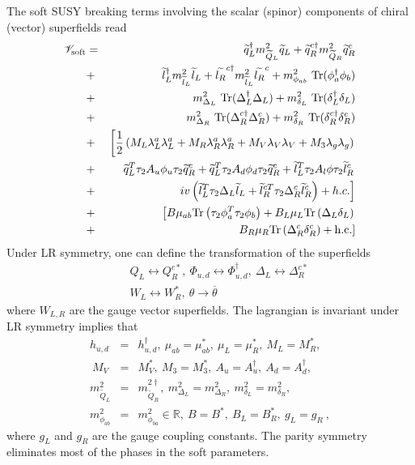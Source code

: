 \documentclass[prd,aps,preprint,tightenlines,superscriptaddress]{revtex4}
\begin{document}
The soft SUSY breaking terms involving the scalar (spinor) components of chiral
(vector) superfields read
\begin{eqnarray}
\mathscr{V}_{\rm soft} &=& \widetilde q_L^\dag m_{\widetilde Q_L}^2 \widetilde q_L +
\widetilde q_R^{c\dag} m_{\widetilde Q_R}^2
\widetilde q_R^c \nonumber \\
& + & \widetilde l_L^\dag m_{\widetilde l_L}^2 \widetilde
l_L + \widetilde{l_R}^{c \dag} m_{\widetilde l_L}^2 \widetilde{l_R}^c + m^2_{\phi_{ab}}{~\rm Tr}(\phi_a^\dag \phi_b) \nonumber \\
& + & m_{\Delta_L}^2 {~\rm Tr}(\Delta_L^\dag \Delta_L) +
m_{\delta_L}^2{~\rm Tr}(\delta_L^\dag \delta_L) \nonumber \\
& + & m_{\Delta_R}^2{~\rm Tr}(\Delta_R^{c\dag} \Delta_R^c) +
m_{\delta_R}^2{~\rm Tr}(\delta_R^{c\dag} \delta_R^c) \nonumber \\
& + & \left[ \frac{1}{2} \left(  M_L \lambda_L^a \lambda^a_L + M_R
\lambda_R^a \lambda^a_R + M_V \lambda_V \lambda_V + M_3 \lambda_g
\lambda_g \right) \right.  \nonumber\\
& + & \left. \widetilde q_L^T \tau_2 A_u \phi_u \tau_2 \widetilde
q_R^c + \widetilde q_L^T \tau_2 A_d \phi_d \tau_2 \widetilde q_R^c +
\widetilde l_L^T \tau_2 A_l \phi \tau_2 \widetilde l_R^c \right. \nonumber \\
& + & \left. i v \left( \widetilde l_L^T \tau_2 \Delta_L \widetilde l_L + \widetilde
l_R^{cT} \tau_2 \Delta_R^c \widetilde l_R^c \right) + h.c. \right] \nonumber \\
& + & \left[  B \mu_{ab} {\rm Tr}\left( \tau_2 \phi_a^T \tau_2 \phi_b
\right) + B_L \mu_L {\rm Tr}\left( \Delta_L \delta_L \right) \right. \nonumber \\
& + & \left.  B_R \mu_R {\rm Tr}\left( \Delta_R^c \delta_R^c \right)  + {\rm h.c.}
\right]
\end{eqnarray}
Under LR symmetry, one can define the transformation of the superfields \cite{susylr}
\begin{eqnarray}
&&Q_L \leftrightarrow Q_R^{c*}, \ \Phi_{u,d} \leftrightarrow
\Phi_{u,d}^{\dag},\ \Delta_L \leftrightarrow \Delta_R^{c*} \nonumber \\
&& W_L \leftrightarrow W_R^{*}, \ \theta \rightarrow \overline
\theta
\end{eqnarray}
where $W_{L, R}$ are the gauge vector superfields.  The lagrangian is invariant under
LR symmetry implies that
\begin{eqnarray}\label{hermitian}
h_{u, d} &=& h_{u, d}^{\dag}, \ \mu_{ab} = \mu_{ab}^*, \ \mu_L =
\mu_R^*, \ M_L = M_R^*, \nonumber \\
\ M_V &=& M_V^*, \ M_3 = M_3^*, \ A_u = A_u^{\dag}, \ A_d =
A_d^{\dag}, \nonumber \\
m_{\widetilde Q_L}^2 &=& m_{\widetilde Q_R}^{2\dag}, \
m_{\Delta_L}^2 = m_{\Delta_R}^2, \ m_{\delta_L}^2 = m_{\delta_R}^2, \nonumber \\
m_{\phi_{ab}}^2 &=& m_{\phi_{ba}}^2 \in \mathbb{R}, \ B = B^*, \ B_{L} = B_R^*, \ g_L=
g_R \ ,
\end{eqnarray}
where $g_L$ and $g_R$ are the gauge coupling constants. The parity symmetry eliminates
most of the phases in the soft parameters.
\end{document}
